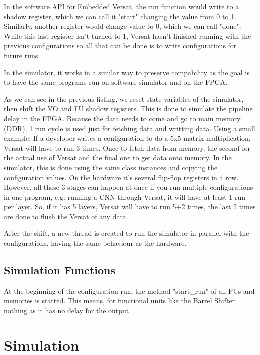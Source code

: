 In the software API for Embedded Versat, the run function would write to a shadow register,
which we can call it "start" changing the value from 0 to 1. Similarly, another register would
change value to 0, which we can call "done". While this last register isn't turned to 1, 
Versat hasn't finished running with the previous configurations so all that can be done is to write
configurations for future runs.

In the simulator, it works in a similar way to preserve compability as the goal is to have the same
programs run on software simulator and on the FPGA.



As we can see in the previous listing, we reset state variables of the simulator, then shift the 
VO and FU shadow registers.
This is done to simulate the pipeline delay in the FPGA. Because the data needs to come and go to main memory (DDR),
1 run cycle is used just for fetching data and writting data. Using a small example:
If a developer writes a configuration to do a 5x5 matrix multiplication, Versat will have to run 3 times.
Once to fetch data from memory, the second for the actual use of Versat and the final one to get data onto memory.
In the simulator, this is done using the same class instances and copying the configuration values. On the hardware it's several flip-flop registers in a row.
However, all these 3 stages can happen at once if you run multiple configurations in one program, e.g: running a CNN
through Versat, it will have at least 1 run per layer. So, if it has 5 layers, Versat will have to run 5+2 times, the last 2 times are done to
flush the Versat of any data.

After the shift, a new thread is created to run the simulator in parallel with the configurations,
having the same behaviour as the hardware.

\subsection{Simulation Functions}

At the beginning of the configuration run, the method "start_run" of all FUs and memories is started.
This means, for functional units like the Barrel Shifter nothing as it has no delay for the output
\section{Simulation}


